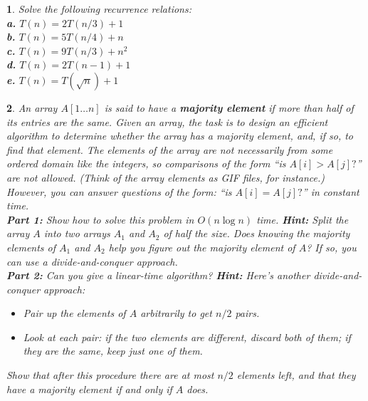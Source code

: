 \documentclass[%
addpoints]{exam}
\theoremstyle{problem}
\newtheorem{p}{}
\begin{document}
\begin{p}
Solve the following recurrence relations:\\
\vspace{10pt}
\textbf{a.} \( T(n) = 2T(n/3) + 1 \)\\
\textbf{b.} \( T(n) = 5T(n/4) + n \)\\
\textbf{c.} \( T(n) = 9T(n/3) + n^2 \)\\
\textbf{d.} \( T(n) = 2T(n-1) + 1 \)\\
\textbf{e.} \( T(n) = T(\sqrt{n}) + 1 \)\\
\hfill \end{p}

\begin{p}
An array \( A[1 \dots n] \) is said to have a \textbf{majority element} if more than half of its entries are the same. Given an array, the task is to design an efficient algorithm to determine whether the array has a majority element, and, if so, to find that element. The elements of the array are not necessarily from some ordered domain like the integers, so comparisons of the form “is \( A[i] > A[j]? \)” are not allowed. (Think of the array elements as GIF files, for instance.) However, you can answer questions of the form: “is \( A[i] = A[j]? \)” in constant time.\\
\vspace{10pt}
\textbf{Part 1:} Show how to solve this problem in \( O(n \log n) \) time. 
\textbf{Hint:} Split the array \( A \) into two arrays \( A_1 \) and \( A_2 \) of half the size. Does knowing the majority elements of \( A_1 \) and \( A_2 \) help you figure out the majority element of \( A \)? If so, you can use a \textit{divide-and-conquer} approach.\\
\vspace{10pt}
\textbf{Part 2:} Can you give a linear-time algorithm? 
\textbf{Hint:} Here’s another \textit{divide-and-conquer} approach:
\begin{itemize}
    \item Pair up the elements of \( A \) arbitrarily to get \( n/2 \) pairs.
    \item Look at each pair: if the two elements are different, discard both of them; if they are the same, keep just one of them.
\end{itemize}
Show that after this procedure there are at most \( n/2 \) elements left, and that they have a majority element if and only if \( A \) does.
\hfill \end{p}
\end{document}
